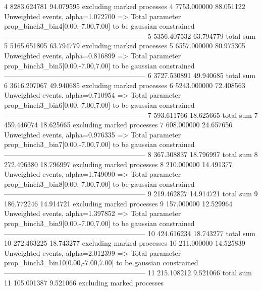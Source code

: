 4          8283.624781     94.079595       excluding marked processes    
4          7753.000000     88.051122       Unweighted events, alpha=1.072700
  => Total parameter prop_binch3_bin4[0.00,-7.00,7.00] to be gaussian constrained
------------------------------------------------------------
5          5356.407532     63.794779       total sum                     
5          5165.651805     63.794779       excluding marked processes    
5          6557.000000     80.975305       Unweighted events, alpha=0.816899
  => Total parameter prop_binch3_bin5[0.00,-7.00,7.00] to be gaussian constrained
------------------------------------------------------------
6          3727.530891     49.940685       total sum                     
6          3616.207067     49.940685       excluding marked processes    
6          5243.000000     72.408563       Unweighted events, alpha=0.710954
  => Total parameter prop_binch3_bin6[0.00,-7.00,7.00] to be gaussian constrained
------------------------------------------------------------
7          593.611766      18.625665       total sum                     
7          459.446074      18.625665       excluding marked processes    
7          608.000000      24.657656       Unweighted events, alpha=0.976335
  => Total parameter prop_binch3_bin7[0.00,-7.00,7.00] to be gaussian constrained
------------------------------------------------------------
8          367.308837      18.796997       total sum                     
8          272.496380      18.796997       excluding marked processes    
8          210.000000      14.491377       Unweighted events, alpha=1.749090
  => Total parameter prop_binch3_bin8[0.00,-7.00,7.00] to be gaussian constrained
------------------------------------------------------------
9          219.462827      14.914721       total sum                     
9          186.772246      14.914721       excluding marked processes    
9          157.000000      12.529964       Unweighted events, alpha=1.397852
  => Total parameter prop_binch3_bin9[0.00,-7.00,7.00] to be gaussian constrained
------------------------------------------------------------
10         424.616234      18.743277       total sum                     
10         272.463225      18.743277       excluding marked processes    
10         211.000000      14.525839       Unweighted events, alpha=2.012399
  => Total parameter prop_binch3_bin10[0.00,-7.00,7.00] to be gaussian constrained
------------------------------------------------------------
11         215.108212      9.521066        total sum                     
11         105.001387      9.521066        excluding marked processes    

